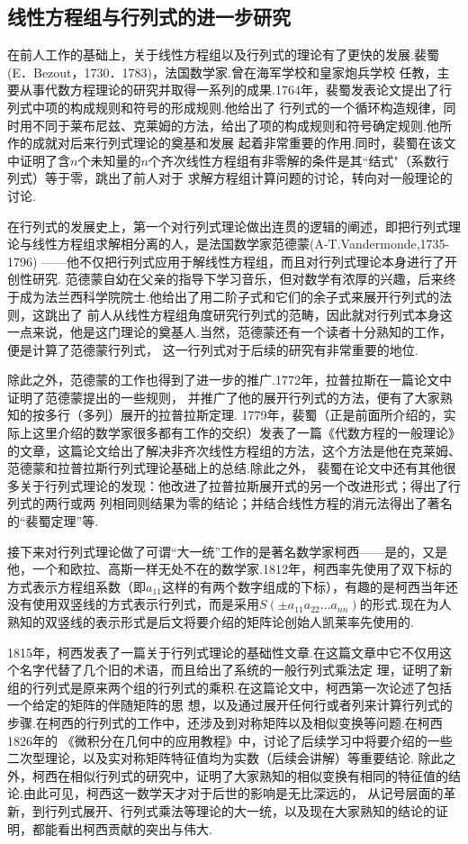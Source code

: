 \documentclass{ctexbook}
\begin{document}
\subsection{线性方程组与行列式的进一步研究}
在前人工作的基础上，关于线性方程组以及行列式的理论有了更快的发展.裴蜀(E．Bezout，1730．1783)，法国数学家.曾在海军学校和皇家炮兵学校
任教，主要从事代数方程理论的研究并取得一系列的成果.1764年，裴蜀发表论文提出了行列式中项的构成规则和符号的形成规则.他给出了
行列式的一个循环构造规律，同时用不同于莱布尼兹、克莱姆的方法，给出了项的构成规则和符号确定规则.他所作的成就对后来行列式理论的奠基和发展
起着非常重要的作用.同时，裴蜀在该文中证明了含$n$个未知量的$n$个齐次线性方程组有非零解的条件是其“结式"（系数行列式）等于零，跳出了前人对于
求解方程组计算问题的讨论，转向对一般理论的讨论.

在行列式的发展史上，第一个对行列式理论做出连贯的逻辑的阐述，即把行列式理论与线性方程组求解相分离的人，是法国数学家范德蒙(A-T.Vandermonde,1735-1796)
——他不仅把行列式应用于解线性方程组，而且对行列式理论本身进行了开创性研究.
范德蒙自幼在父亲的指导下学习音乐，但对数学有浓厚的兴趣，后来终于成为法兰西科学院院士.他给出了用二阶子式和它们的余子式来展开行列式的法则，这跳出了
前人从线性方程组角度研究行列式的范畴，因此就对行列式本身这一点来说，他是这门理论的奠基人.当然，范德蒙还有一个读者十分熟知的工作，便是计算了范德蒙行列式，
这一行列式对于后续的研究有非常重要的地位.

除此之外，范德蒙的工作也得到了进一步的推广.1772年，拉普拉斯在一篇论文中证明了范德蒙提出的一些规则，
并推广了他的展开行列式的方法，便有了大家熟知的按多行（多列）展开的拉普拉斯定理.
1779年，裴蜀（正是前面所介绍的，实际上这里介绍的数学家很多都有工作的交织）发表了一篇《代数方程的一般理论》
的文章，这篇论文给出了解决非齐次线性方程组的方法，这个方法是他在克莱姆、范德蒙和拉普拉斯行列式理论基础上的总结.除此之外，
裴蜀在论文中还有其他很多关于行列式理论的发现：他改进了拉普拉斯展开式的另一个改进形式；得出了行列式的两行或两
列相同则结果为零的结论；并结合线性方程的消元法得出了著名的``裴蜀定理''等.

接下来对行列式理论做了可谓``大一统''工作的是著名数学家柯西——是的，又是他，一个和欧拉、高斯一样无处不在的数学家.1812年，柯西率先使用了双下标的方式表示方程组系数（即$a_{11}$这样的有两个数字组成的下标），有趣的是柯西当年还没有使用双竖线的方式表示行列式，而是采用$S(\pm a_{11}a_{22}\ldots a_{nn})$的形式.现在为人熟知的双竖线的表示形式是后文将要介绍的矩阵论创始人凯莱率先使用的.

1815年，柯西发表了一篇关于行列式理论的基础性文章.在这篇文章中它不仅用这个名字代替了几个旧的术语，而且给出了系统的一般行列式乘法定
理，证明了新组的行列式是原来两个组的行列式的乘积.在这篇论文中，柯西第一次论述了包括一个给定的矩阵的伴随矩阵的思
想，以及通过展开任何行或者列来计算行列式的步骤.在柯西的行列式的工作中，还涉及到对称矩阵以及相似变换等问题.在柯西1826年的
《微积分在几何中的应用教程》中，讨论了后续学习中将要介绍的一些二次型理论，以及实对称矩阵特征值均为实数（后续会讲解）等重要结论.
除此之外，柯西在相似行列式的研究中，证明了大家熟知的相似变换有相同的特征值的结论.由此可见，柯西这一数学天才对于后世的影响是无比深远的，
从记号层面的革新，到行列式展开、行列式乘法等理论的大一统，以及现在大家熟知的结论的证明，都能看出柯西贡献的突出与伟大.
\end{document}

